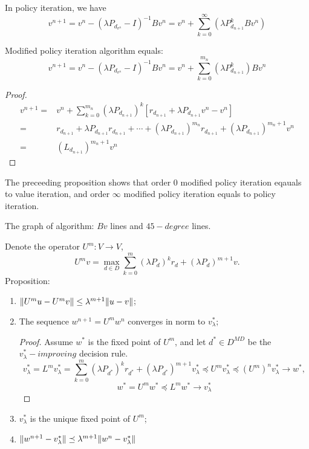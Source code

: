 In policy iteration, we have
\[
    v^{n+1} = v^n - {(\lambda P _{d_{v^{n}}} - I) }^{-1} B v^{n} = v^n + \sum^{\infty}_{k = 0} {\left( \lambda P_{d_{n+1}}^k B v^n \right)}
\]
\begin{proposition}
    Modified policy iteration algorithm equals:
    \[
        v^{n+1} = v^n - {(\lambda P _{d_{v^{n}}} - I) }^{-1} B v^{n} = v^n + \sum^{m_n}_{k = 0} {\left( \lambda P_{d_{n+1}}^k\right) B v^n }
    \]
    \begin{proof}
        \begin{align*}
            v^{n+1} =& v^n + \sum^{m_n}_{k=0} {\left( \lambda P_{d_{n+1}} \right)}^k \left[ r_{d_{n+1}} + \lambda P_{d_{n+1}} v^n - v^n \right]\\
            =& r_{d_{n+1}} + \lambda P_{d_{n+1}}r_{d_{n+1}} + \cdots + {\left(\lambda P_{d_{n+1}}\right)}^{m_n}r_{d_{n+1}} + {\left( \lambda P_{d_{n+1}} \right)}^{m_n + 1} v^n\\
            =& {(L_{d_{n+1}})}^{m_n+1}v^n
        \end{align*}
    \end{proof}
\end{proposition}
The preceeding proposition shows that order 0 modified policy iteration eqauals to value iteration, and order $ \infty $ modified policy iteration equals to policy iteration. 

The graph of algorithm: $ Bv $ lines and $ 45-degree $ lines.

Denote the operator $ U^m: V \rightarrow V $, 
\[
    U^m v = \max_{d \in D} \sum^{m}_{k=0} {(\lambda P_d)}^k r_d + {(\lambda P_d)}^{m+1}v.
\]
Proposition:
\begin{enumerate}
    \item $ \Arrowvert U^m u - U^m v \Arrowvert \le \lambda^{m+1} \Arrowvert u - v \Arrowvert $;
    \item The sequence $ w^{n+1} = U^m w^n $ converges in norm to $ v^*_\lambda $;
        \begin{proof}
            Assume $ w^* $ is the fixed point of $ U^m $, and let $ d^* \in D^{MD} $ be the $ v^*_\lambda-improving $ decision rule.
            \[
                v^*_\lambda = L^m v^*_\lambda = \sum^{m}_{k=0} {(\lambda P_{d^*})}^k r_{d^*} + {(\lambda P_{d^*})}^{m+1} v^*_\lambda \preceq U^m v^*_\lambda \preceq {(U^m)}^n v^*_\lambda \rightarrow w^*,
            \]
            \[
                w^* = U^m w^* \preceq L^m w^* \rightarrow v^*_\lambda
            \]
            
        \end{proof}
    \item $ v^*_{\lambda} $ is the unique fixed point of $ U^m $;
    \item $ \Arrowvert w^{n+1} - v^*_{\lambda} \Arrowvert \preceq \lambda^{m+1} \Arrowvert w^n - v^*_{\lambda} \Arrowvert $
\end{enumerate}

